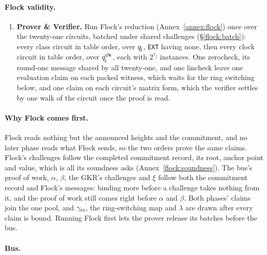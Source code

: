 \paragraph{Flock validity.}

\begin{enumerate}
\item \textbf{Prover \& Verifier.} Run Flock's reduction (Annex~\ref{annex:flock}) once over the twenty-one circuits, batched under shared challenges (\S\ref{flock:batch}): every class circuit in table order, over $q_{\mathsf{j}}$, \texttt{EXT} having none, then every clock circuit in table order, over $q^{\mathsf{clk}}_{\mathsf{j}}$, each with $2^{\tau_j}$ instances. One zerocheck, its round-one message shared by all twenty-one, and one lincheck leave one evaluation claim on each packed witness, which waits for the ring switching below, and one claim on each circuit's matrix form, which the verifier settles by one walk of the circuit once the proof is read.
\end{enumerate}

\paragraph{Why Flock comes first.} Flock reads nothing but the announced heights and the commitment, and no later phase reads what Flock sends, so the two orders prove the same claims. Flock's challenges follow the completed commitment record, its root, anchor point and value, which is all its soundness asks (Annex~\ref{flock:soundness}). The bus's proof of work, $\alpha$, $\beta$, the GKR's challenges and $\xi$ follow both the commitment record and Flock's messages: binding more before a challenge takes nothing from it, and the proof of work still comes right before $\alpha$ and $\beta$. Both phases' claims join the one pool, and $\gamma_{\mathrm{rs}}$, the ring-switching map and $\lambda$ are drawn after every claim is bound. Running Flock first lets the prover release its batches before the bus.

\paragraph{Bus.}

